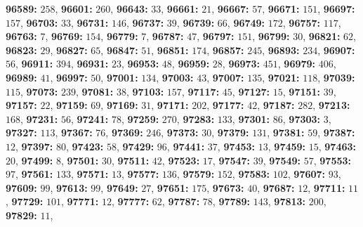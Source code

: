 \textsf{\bfseries 96589:} $258$, \textsf{\bfseries 96601:} $260$, \textsf{\bfseries 96643:} $33$, \textsf{\bfseries 96661:} $21$, \textsf{\bfseries 96667:} $57$, \textsf{\bfseries 96671:} $151$, \textsf{\bfseries 96697:} $157$, \textsf{\bfseries 96703:} $33$, \textsf{\bfseries 96731:} $146$, \textsf{\bfseries 96737:} $39$, \textsf{\bfseries 96739:} $66$, \textsf{\bfseries 96749:} $172$, \textsf{\bfseries 96757:} $117$, \textsf{\bfseries 96763:} $7$, \textsf{\bfseries 96769:} $154$, \textsf{\bfseries 96779:} $7$, \textsf{\bfseries 96787:} $47$, \textsf{\bfseries 96797:} $151$, \textsf{\bfseries 96799:} $30$, \textsf{\bfseries 96821:} $62$, \textsf{\bfseries 96823:} $29$, \textsf{\bfseries 96827:} $65$, \textsf{\bfseries 96847:} $51$, \textsf{\bfseries 96851:} $174$, \textsf{\bfseries 96857:} $245$, \textsf{\bfseries 96893:} $234$, \textsf{\bfseries 96907:} $56$, \textsf{\bfseries 96911:} $394$, \textsf{\bfseries 96931:} $23$, \textsf{\bfseries 96953:} $48$, \textsf{\bfseries 96959:} $28$, \textsf{\bfseries 96973:} $451$, \textsf{\bfseries 96979:} $406$, \textsf{\bfseries 96989:} $41$, \textsf{\bfseries 96997:} $50$, \textsf{\bfseries 97001:} $134$, \textsf{\bfseries 97003:} $43$, \textsf{\bfseries 97007:} $135$, \textsf{\bfseries 97021:} $118$, \textsf{\bfseries 97039:} $115$, \textsf{\bfseries 97073:} $239$, \textsf{\bfseries 97081:} $38$, \textsf{\bfseries 97103:} $157$, \textsf{\bfseries 97117:} $45$, \textsf{\bfseries 97127:} $15$, \textsf{\bfseries 97151:} $39$, \textsf{\bfseries 97157:} $22$, \textsf{\bfseries 97159:} $69$, \textsf{\bfseries 97169:} $31$, \textsf{\bfseries 97171:} $202$, \textsf{\bfseries 97177:} $42$, \textsf{\bfseries 97187:} $282$, \textsf{\bfseries 97213:} $168$, \textsf{\bfseries 97231:} $56$, \textsf{\bfseries 97241:} $78$, \textsf{\bfseries 97259:} $270$, \textsf{\bfseries 97283:} $133$, \textsf{\bfseries 97301:} $86$, \textsf{\bfseries 97303:} $3$, \textsf{\bfseries 97327:} $113$, \textsf{\bfseries 97367:} $76$, \textsf{\bfseries 97369:} $246$, \textsf{\bfseries 97373:} $30$, \textsf{\bfseries 97379:} $131$, \textsf{\bfseries 97381:} $59$, \textsf{\bfseries 97387:} $12$, \textsf{\bfseries 97397:} $80$, \textsf{\bfseries 97423:} $58$, \textsf{\bfseries 97429:} $96$, \textsf{\bfseries 97441:} $37$, \textsf{\bfseries 97453:} $13$, \textsf{\bfseries 97459:} $15$, \textsf{\bfseries 97463:} $20$, \textsf{\bfseries 97499:} $8$, \textsf{\bfseries 97501:} $30$, \textsf{\bfseries 97511:} $42$, \textsf{\bfseries 97523:} $17$, \textsf{\bfseries 97547:} $39$, \textsf{\bfseries 97549:} $57$, \textsf{\bfseries 97553:} $97$, \textsf{\bfseries 97561:} $133$, \textsf{\bfseries 97571:} $13$, \textsf{\bfseries 97577:} $136$, \textsf{\bfseries 97579:} $152$, \textsf{\bfseries 97583:} $102$, \textsf{\bfseries 97607:} $93$, \textsf{\bfseries 97609:} $99$, \textsf{\bfseries 97613:} $99$, \textsf{\bfseries 97649:} $27$, \textsf{\bfseries 97651:} $175$, \textsf{\bfseries 97673:} $40$, \textsf{\bfseries 97687:} $12$, \textsf{\bfseries 97711:} $11$, \textsf{\bfseries 97729:} $101$, \textsf{\bfseries 97771:} $12$, \textsf{\bfseries 97777:} $62$, \textsf{\bfseries 97787:} $78$, \textsf{\bfseries 97789:} $143$, \textsf{\bfseries 97813:} $200$, \textsf{\bfseries 97829:} $11$, 
